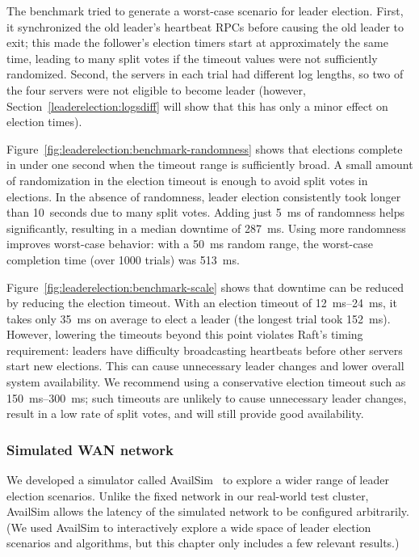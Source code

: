 The benchmark tried to generate a worst-case scenario for leader
election. First, it synchronized the old leader's heartbeat RPCs before
causing the old leader to exit; this made the follower's election timers
start at approximately the same time, leading to many split votes if the
timeout values were not sufficiently randomized. Second, the servers in
each trial had different log lengths, so two of the four servers were not
eligible to become leader (however, Section~\ref{leaderelection:logsdiff}
will show that this has only a minor effect on election times).

Figure~\ref{fig:leaderelection:benchmark-randomness} shows that elections
complete in under one second when the timeout range is sufficiently
broad. A small amount of randomization in the election timeout is enough
to avoid split votes in elections. In the absence of randomness, leader
election consistently took longer than \SI{10}{seconds} due to many split
votes. Adding just \SI{5}{\milli\second} of randomness helps
significantly, resulting in
a median downtime of \SI{287}{\milli\second}.
Using more randomness improves worst-case
behavior: with a \SI{50}{\milli\second} random range, the worst-case
completion time
(over \num{1000} trials) was \SI{513}{\milli\second}.

Figure~\ref{fig:leaderelection:benchmark-scale} shows that downtime can
be reduced by reducing the election timeout.
With an election timeout of
\SIrange{12}{24}{\milli\second}, it takes only
\SI{35}{\milli\second} on average to elect a leader
(the longest trial took \SI{152}{\milli\second}).
However, lowering the timeouts beyond this point violates Raft's timing
requirement: leaders have difficulty broadcasting heartbeats before
other servers start new elections. This can cause unnecessary leader
changes and lower overall system availability.
We recommend using a conservative election timeout such as
\SIrange{150}{300}{\milli\second};
such timeouts are unlikely to cause unnecessary leader changes, result
in a low rate of split votes, and will still provide good availability.

\subsubsection{Simulated WAN network}

We developed a simulator called AvailSim~\cite{availsim} to
explore a wider range of leader election scenarios. Unlike the
fixed network in our real-world test cluster, AvailSim allows the
latency of the simulated network to be configured arbitrarily.
(We used AvailSim to interactively explore a wide space of leader
election scenarios and algorithms, but this chapter only includes a few
relevant results.)

